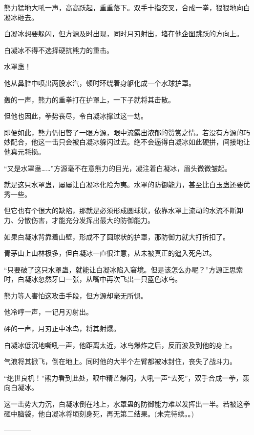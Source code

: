 \begin{this_body}
熊力猛地大吼一声，高高跃起，重重落下。双手十指交叉，合成一拳，狠狠地向白凝冰砸去。

白凝冰想要躲闪，但方源及时出现，同时月刃射出，堵在他企图跳跃的方向上。

白凝冰不得不选择硬抗熊力的重击。

水罩蛊！

他从鼻腔中喷出两股水汽，顿时环绕着身躯化成一个水球护罩。

轰的一声，熊力的重拳打在护罩上，一下子就将其击散。

但他也因此，拳势丧尽，令白凝冰撑过这一劫。

即便如此，熊力仍旧瞥了一眼方源，眼中流露出浓郁的赞赏之情。若没有方源的巧妙配合，他这一击只会被白凝冰躲闪过去。绝不会逼得白凝冰如此硬拼，间接地让他真元耗损。

“又是水罩蛊……”方源毫不在意熊力的目光，凝注着白凝冰，眉头微微皱起。

就是这只水罩蛊，屡屡让白凝冰化险为夷。水罩的防御能力，甚至比白玉蛊还要优秀一些。

但它也有个很大的缺陷，那就是必须形成圆球状，依靠水罩上流动的水流不断卸力、分散伤害，才能充分发挥出最大的防御能力。

如果白凝冰背靠着山壁，形成不了圆球状的护罩，那防御力就大打折扣了。

青茅山上山林极多，但白凝冰一直很注意，从未被真正的逼入死角过。

“只要破了这只水罩蛊，就能让白凝冰陷入窘境。但是该怎么办呢？”方源正思索时，白凝冰忽然牙口一张，从嘴中再次飞出一只蓝色冰鸟。

熊力等人害怕这攻击手段，但方源却毫无所惧。

他冷哼一声，一记月刃射出。

砰的一声，月刃正中冰鸟，将其射爆。

白凝冰低沉地嘶吼一声，他距离太近，冰鸟爆炸之后，反而波及到他的身上。

气浪将其掀飞，倒在地上。同时他的大半个左臂都被冰封住，丧失了战斗力。

“绝世良机！”熊力看到此处，眼中精芒爆闪，大吼一声“去死”，双手合成一拳，轰向白凝冰。

这一击势大力沉，白凝冰倒在地上，水罩蛊的防御能力难以发挥出一半。若被这拳砸中脑袋，他白凝冰将顷刻身死，再无第二结果。(未完待续。。)

------------

\end{this_body}

